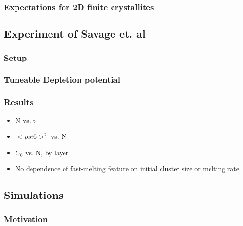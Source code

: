 \documentclass[11pt]{article}
\begin{document}
\subsubsection{Expectations for 2D finite crystallites}
\label{sec-2.1.2}

\subsection{Experiment of Savage et. al}
\label{sec-2.2}

\subsubsection{Setup}
\label{sec-2.2.1}

\subsubsection{Tuneable Depletion potential}
\label{sec-2.2.2}

\subsubsection{Results}
\label{sec-2.2.3}

\begin{itemize}

\item N vs. t\\
\label{sec-2.2.3.1}


\item $< psi6 >^2$ vs. N\\
\label{sec-2.2.3.2}


\item $C_6$ vs. N, by layer\\
\label{sec-2.2.3.3}


\item No dependence of fast-melting feature on initial cluster size or melting rate\\
\label{sec-2.2.3.4}

\end{itemize} %
\subsection{Simulations}
\label{sec-2.3}

\subsubsection{Motivation}
\label{sec-2.3.1}
\end{document}
